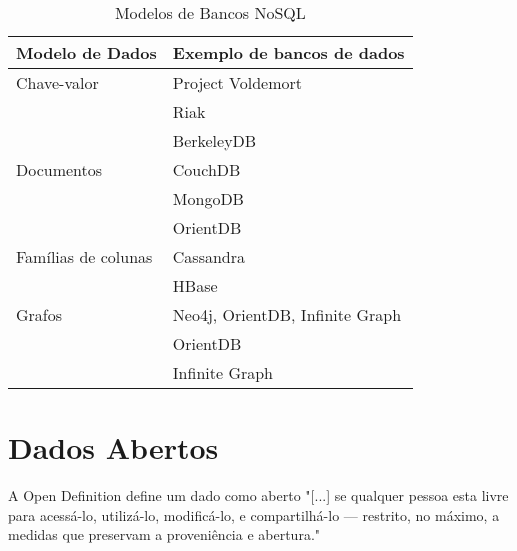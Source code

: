 \begin{table}[]
\centering
\caption{Modelos de Bancos NoSQL}
\label{tab:modelosnosql}
\begin{tabular}{ll}
\textbf{Modelo de Dados}     & \textbf{Exemplo de bancos de dados}      \\ \hline
Chave-valor         & Project Voldemort               \\
                    & Riak                            \\
                    & BerkeleyDB                      \\ \hline
Documentos          & CouchDB                         \\
                    & MongoDB                         \\
                    & OrientDB                        \\ \hline
Famílias de colunas & Cassandra                       \\
                    & HBase                           \\ \hline
Grafos              & Neo4j, OrientDB, Infinite Graph \\
                    & OrientDB                        \\
                    & Infinite Graph                 
\end{tabular}
\end{table}

\section{Dados Abertos}
A Open Definition define um dado como aberto "[...] se qualquer pessoa esta livre para acessá-lo, utilizá-lo, modificá-lo, e compartilhá-lo — restrito, no máximo, a medidas que preservam a proveniência e abertura."\cite{opendefinition}












